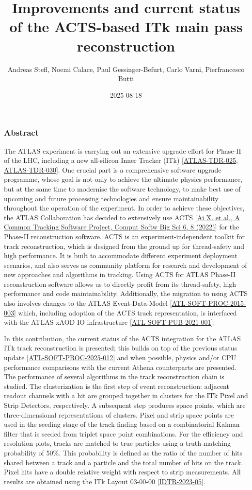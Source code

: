\documentclass[aspectratio=169]{beamer}
\title{Improvements and current status of the ACTS-based ITk main pass reconstruction}
\author{Andreas Stefl, Noemi Calace, Paul Gessinger-Befurt, Carlo Varni, Pierfrancesco Butti}
\institute{CERN}
\date{2025-08-18}
\begin{document}
\frame{\titlepage}

\begin{frame}
\frametitle{Abstract}
\tiny
The ATLAS experiment is carrying out an extensive upgrade effort for Phase-II of the LHC, including a new all-silicon Inner Tracker (ITk) [\href{https://cds.cern.ch/record/2257755}{ATLAS-TDR-025}, \href{https://cds.cern.ch/record/2285585}{ATLAS-TDR-030}]. One crucial part is a comprehensive software upgrade programme, whose goal is not only to achieve the ultimate physics performance, but at the same time to modernise the software technology, to make best use of upcoming and future processing technologies and ensure maintainability throughout the operation of the experiment. In order to achieve these objectives, the ATLAS Collaboration has decided to extensively use ACTS [\href{https://doi.org/10.1007/s41781-021-00078-8}{Ai X. et al., A Common Tracking Software Project, Comput Softw Big Sci 6, 8 (2022)}] for the Phase-II reconstruction software. ACTS is an experiment-independent toolkit for track reconstruction, which is designed from the ground up for thread-safety and high performance. It is built to accommodate different experiment deployment scenarios, and also serves as community platform for research and development of new approaches and algorithms in tracking. Using ACTS for ATLAS Phase-II reconstruction software allows us to directly profit from its thread-safety, high performance and code maintainability. Additionally, the migration to using ACTS also involves changes to the ATLAS Event-Data-Model [\href{https://cds.cern.ch/record/2014150}{ATL-SOFT-PROC-2015-003}] which, including adoption of the ACTS track representation, is interfaced with the ATLAS xAOD IO infrastructure [\href{https://cds.cern.ch/record/2767187}{ATL-SOFT-PUB-2021-001}].

In this contribution, the current status of the ACTS integration for the ATLAS ITk track reconstruction is presented; this builds on top of the previous status update [\href{https://cds.cern.ch/record/2921878}{ATL-SOFT-PROC-2025-012}] and when possible, physics and/or CPU performance comparisons with the current Athena counterparts are presented. The performance of several algorithms in the track reconstruction chain is studied. The clusterization is the first step of event reconstruction: adjacent readout channels with a hit are grouped together in clusters for the ITk Pixel and Strip Detectors, respectively. A subsequent step produces space points, which are three-dimensional representations of clusters. Pixel and strip space points are used in the seeding stage of the track finding based on a combinatorial Kalman filter that is seeded from triplet space point combinations. For the efficiency and resolution plots, tracks are matched to true particles using a truth-matching probability of 50\%. This probability is defined as the ratio of the number of hits shared between a track and a particle and the total number of hits on the track. Pixel hits have a double relative weight with respect to strip measurements. All results are obtained using the ITk Layout 03-00-00 [\href{https://atlas.web.cern.ch/Atlas/GROUPS/PHYSICS/PLOTS/IDTR-2023-05}{IDTR-2023-05}].
\end{frame}
\end{document}
